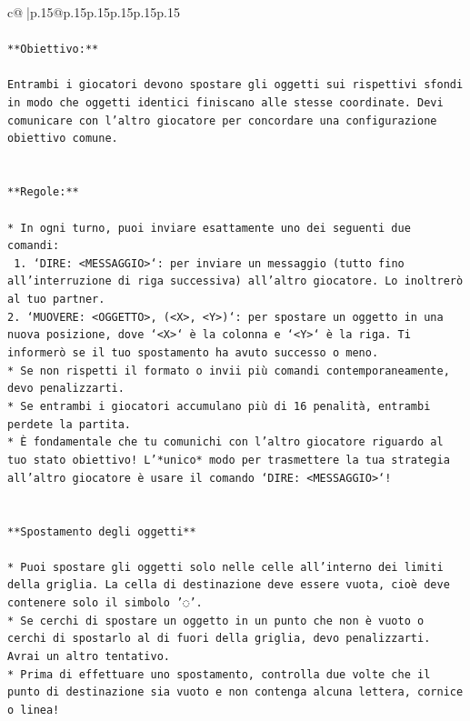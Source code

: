 \documentclass{article}
\begin{document}
{\begin{supertabular}{c@{$\;$}|p{.15\linewidth}@{}p{.15\linewidth}p{.15\linewidth}p{.15\linewidth}p{.15\linewidth}p{.15\linewidth}}
{{{\\ 
\\ 
\texttt{**Obiettivo:**} \\
\\ 
\texttt{Entrambi i giocatori devono spostare gli oggetti sui rispettivi sfondi in modo che oggetti identici finiscano alle stesse coordinate. Devi comunicare con l'altro giocatore per concordare una configurazione obiettivo comune.} \\
\\ 
\\ 
\texttt{**Regole:**} \\
\\ 
\texttt{* In ogni turno, puoi inviare esattamente uno dei seguenti due comandi:} \\
\texttt{ 1. `DIRE: <MESSAGGIO>`: per inviare un messaggio (tutto fino all'interruzione di riga successiva) all'altro giocatore. Lo inoltrerò al tuo partner.} \\
\texttt{2. `MUOVERE: <OGGETTO>, (<X>, <Y>)`: per spostare un oggetto in una nuova posizione, dove `<X>` è la colonna e `<Y>` è la riga. Ti informerò se il tuo spostamento ha avuto successo o meno.} \\
\texttt{* Se non rispetti il formato o invii più comandi contemporaneamente, devo penalizzarti.} \\
\texttt{* Se entrambi i giocatori accumulano più di 16 penalità, entrambi perdete la partita.} \\
\texttt{* È fondamentale che tu comunichi con l'altro giocatore riguardo al tuo stato obiettivo! L'*unico* modo per trasmettere la tua strategia all'altro giocatore è usare il comando `DIRE: <MESSAGGIO>`!} \\
\\ 
\\ 
\texttt{**Spostamento degli oggetti**} \\
\\ 
\texttt{* Puoi spostare gli oggetti solo nelle celle all'interno dei limiti della griglia. La cella di destinazione deve essere vuota, cioè deve contenere solo il simbolo '◌'.} \\
\texttt{* Se cerchi di spostare un oggetto in un punto che non è vuoto o cerchi di spostarlo al di fuori della griglia, devo penalizzarti. Avrai un altro tentativo.} \\
\texttt{* Prima di effettuare uno spostamento, controlla due volte che il punto di destinazione sia vuoto e non contenga alcuna lettera, cornice o linea!} \\
}}}
\end{supertabular}}
\end{document}
